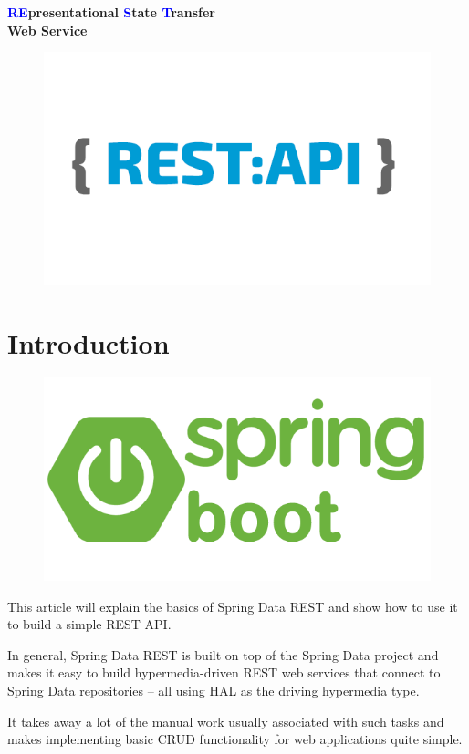 \documentclass{report}
\begin{document}
			\begin{center}
		{\Large \textbf{\textcolor{blue}{RE}presentational \textcolor{blue}{S}tate \textcolor{blue}{T}ransfer \\\vspace{0.3cm} Web Service}}\\\vspace{1cm}
	\end{center}
	\begin{center}
		\begin{figure}
			\includegraphics[width=\linewidth]{images/FrontPageTitle.png}
		\end{figure}
	\end{center}
	\tableofcontents
	\listoffigures
	\listoftables
	\newpage
	\section{Introduction}
		\begin{center}
		\begin{figure}
			\includegraphics[width=\linewidth]{images/springLogo.png}
		\end{figure}
	\end{center}
	This article will explain the basics of Spring Data REST and show how to use it to build a simple REST API.
	\par In general, Spring Data REST is built on top of the Spring Data project and makes it easy to build hypermedia-driven REST web services that connect to Spring Data repositories – all using HAL as the driving hypermedia type.
	\par It takes away a lot of the manual work usually associated with such tasks and makes implementing basic CRUD functionality for web applications quite simple.
\end{document}
